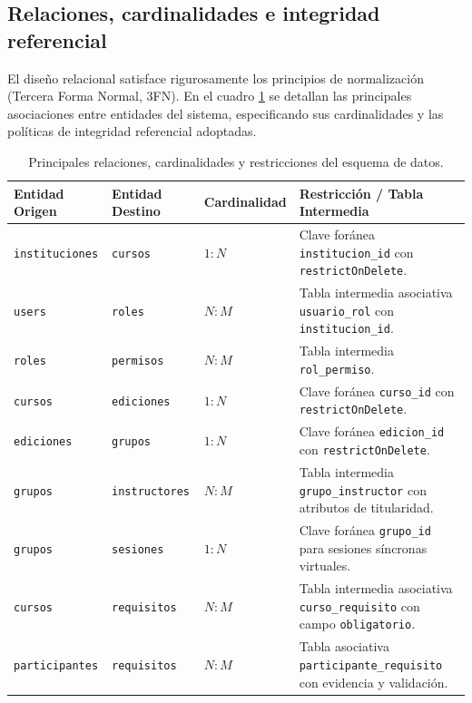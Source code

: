 \subsection{Relaciones, cardinalidades e integridad referencial}
\label{sec:relaciones_cardinalidades}

El diseño relacional satisface rigurosamente los principios de normalización (Tercera Forma Normal, 3FN). En el cuadro \ref{tabla:relaciones_bd} se detallan las principales asociaciones entre entidades del sistema, especificando sus cardinalidades y las políticas de integridad referencial adoptadas.

\begin{table}[htbp]
\centering
\caption{Principales relaciones, cardinalidades y restricciones del esquema de datos.}
\label{tabla:relaciones_bd}
\small
\begin{tabularx}{\textwidth}{|p{3.2cm}|p{3.0cm}|p{2.2cm}|X|}
\hline
\rowcolor[gray]{0.9}
\textbf{Entidad Origen} & \textbf{Entidad Destino} & \textbf{Cardinalidad} & \textbf{Restricción / Tabla Intermedia} \\
\hline
\texttt{instituciones} & \texttt{cursos} & $1:N$ & Clave foránea \texttt{institucion\_id} con \texttt{restrictOnDelete}. \\
\hline
\texttt{users} & \texttt{roles} & $N:M$ & Tabla intermedia asociativa \texttt{usuario\_rol} con \texttt{institucion\_id}. \\
\hline
\texttt{roles} & \texttt{permisos} & $N:M$ & Tabla intermedia \texttt{rol\_permiso}. \\
\hline
\texttt{cursos} & \texttt{ediciones} & $1:N$ & Clave foránea \texttt{curso\_id} con \texttt{restrictOnDelete}. \\
\hline
\texttt{ediciones} & \texttt{grupos} & $1:N$ & Clave foránea \texttt{edicion\_id} con \texttt{restrictOnDelete}. \\
\hline
\texttt{grupos} & \texttt{instructores} & $N:M$ & Tabla intermedia \texttt{grupo\_instructor} con atributos de titularidad. \\
\hline
\texttt{grupos} & \texttt{sesiones} & $1:N$ & Clave foránea \texttt{grupo\_id} para sesiones síncronas virtuales. \\
\hline
\texttt{cursos} & \texttt{requisitos} & $N:M$ & Tabla intermedia asociativa \texttt{curso\_requisito} con campo \texttt{obligatorio}. \\
\hline
\texttt{participantes} & \texttt{requisitos} & $N:M$ & Tabla asociativa \texttt{participante\_requisito} con evidencia y validación. \\

\end{tabularx}
\end{table}
